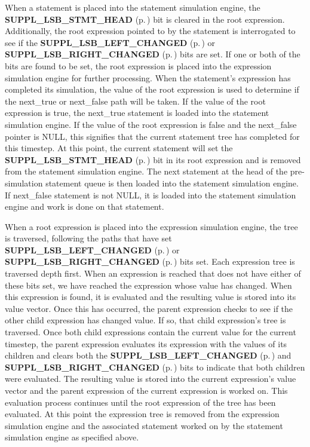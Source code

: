 When a statement is placed into the statement simulation engine, the {\bf SUPPL\_\-LSB\_\-STMT\_\-HEAD} {\rm (p.\,\pageref{group__expr__suppl_a4})}  bit is cleared in the root expression. Additionally, the root expression pointed to by  the statement is interrogated to see if the {\bf SUPPL\_\-LSB\_\-LEFT\_\-CHANGED} {\rm (p.\,\pageref{group__expr__suppl_a9})} or {\bf SUPPL\_\-LSB\_\-RIGHT\_\-CHANGED} {\rm (p.\,\pageref{group__expr__suppl_a10})}  bits are set. If one or both of the bits are found to be set, the root expression  is placed into the expression simulation engine for further processing. When the  statement's expression has completed its simulation, the value of the root expression  is used to determine if the next\_\-true or next\_\-false path will be taken. If the value  of the root expression is true, the next\_\-true statement is loaded into the statement  simulation engine. If the value of the root expression is false and the next\_\-false  pointer is NULL, this signifies that the current statement tree has completed for this  timestep. At this point, the current statement will set the {\bf SUPPL\_\-LSB\_\-STMT\_\-HEAD} {\rm (p.\,\pageref{group__expr__suppl_a4})} bit in  its root expression and is removed from the statement simulation engine. The next statement  at the head of the pre-simulation statement queue is then loaded into the statement  simulation engine. If next\_\-false statement is not NULL, it is loaded into the statement  simulation engine and work is done on that statement.

 When a root expression is placed into the expression simulation engine, the tree is traversed, following the paths that have set {\bf SUPPL\_\-LSB\_\-LEFT\_\-CHANGED} {\rm (p.\,\pageref{group__expr__suppl_a9})} or  {\bf SUPPL\_\-LSB\_\-RIGHT\_\-CHANGED} {\rm (p.\,\pageref{group__expr__suppl_a10})} bits set. Each expression tree is traversed depth first. When an  expression is reached that does not have either of these bits set, we have reached the expression whose value has changed. When this expression is found, it is evaluated and the resulting value is stored into its value vector. Once this has occurred, the parent expression checks to see if the other child expression has changed value. If so, that child expression's tree is traversed. Once both child expressions contain the current value for the current timestep, the parent expression evaluates its expression with the values of its children and clears both the {\bf SUPPL\_\-LSB\_\-LEFT\_\-CHANGED} {\rm (p.\,\pageref{group__expr__suppl_a9})} and {\bf SUPPL\_\-LSB\_\-RIGHT\_\-CHANGED} {\rm (p.\,\pageref{group__expr__suppl_a10})} bits to indicate that both children were evaluated. The resulting value is stored into the current expression's value vector and the parent expression of the current expression is worked on. This evaluation process continues until the root expression of the tree has been evaluated. At this point the expression tree is removed from the expression simulation engine and the associated statement worked on by the statement simulation engine as specified above.



